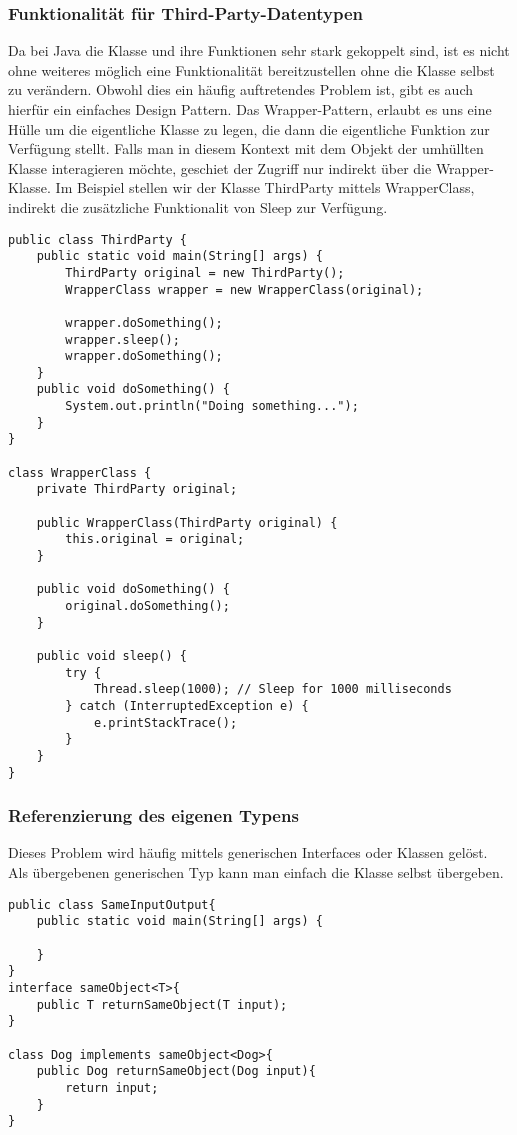 \documentclass[a4paper, 1ppt]{article}
\begin{document}
\subsubsection{Funktionalität für Third-Party-Datentypen}
Da bei Java die Klasse und ihre Funktionen sehr stark gekoppelt sind, ist es nicht ohne weiteres möglich eine Funktionalität bereitzustellen ohne die Klasse selbst zu verändern.
Obwohl dies ein häufig auftretendes Problem ist, gibt es auch hierfür ein einfaches Design Pattern.
Das Wrapper-Pattern\cite{websitedesignpatterns}, erlaubt es uns eine Hülle um die eigentliche Klasse zu legen, die dann die eigentliche Funktion zur Verfügung stellt.
Falls man in diesem Kontext mit dem Objekt der umhüllten Klasse interagieren möchte, geschiet der Zugriff nur indirekt über die Wrapper-Klasse.
Im Beispiel stellen wir der Klasse ThirdParty mittels WrapperClass, indirekt die zusätzliche Funktionalit von Sleep zur Verfügung.
\begin{verbatim}
public class ThirdParty {
    public static void main(String[] args) {
        ThirdParty original = new ThirdParty();
        WrapperClass wrapper = new WrapperClass(original);

        wrapper.doSomething();
        wrapper.sleep();
        wrapper.doSomething();
    }
    public void doSomething() {
        System.out.println("Doing something...");
    }
}

class WrapperClass {
    private ThirdParty original;

    public WrapperClass(ThirdParty original) {
        this.original = original;
    }

    public void doSomething() {
        original.doSomething();
    }

    public void sleep() {
        try {
            Thread.sleep(1000); // Sleep for 1000 milliseconds
        } catch (InterruptedException e) {
            e.printStackTrace();
        }
    }
}
\end{verbatim}
\subsubsection{Referenzierung des eigenen Typens}
Dieses Problem wird häufig mittels generischen Interfaces oder Klassen gelöst.
Als übergebenen generischen Typ kann man einfach die Klasse selbst übergeben.
\begin{verbatim}
public class SameInputOutput{
    public static void main(String[] args) {
        
    }
}
interface sameObject<T>{
    public T returnSameObject(T input);
}

class Dog implements sameObject<Dog>{
    public Dog returnSameObject(Dog input){
        return input;
    }
}
\end{verbatim}
\end{document}
